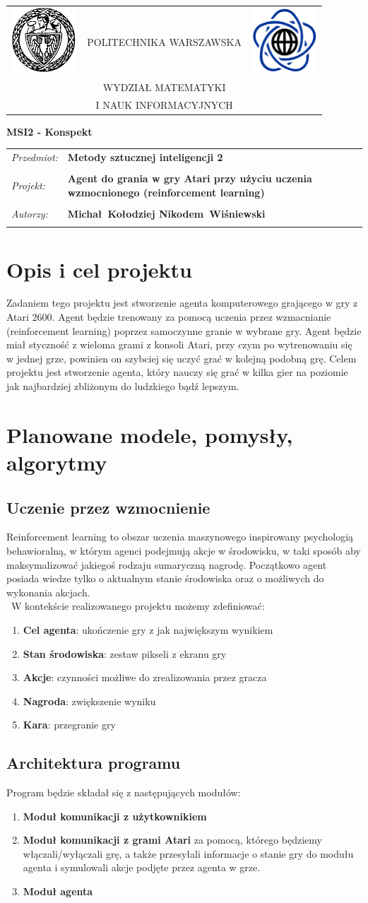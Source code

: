 \documentclass[12pt]{article}
\renewcommand{\maketitle}{
\begin{titlepage}
\begin{table}[t]
\centering
\begin{tabular}[t]{lcr}
 \includegraphics[width=70pt,height=70pt]{PW} & POLITECHNIKA WARSZAWSKA & \includegraphics[width=70pt,height=70pt]{MiNI}\\
& WYDZIAŁ MATEMATYKI & \\
& I NAUK INFORMACYJNYCH &
\end{tabular}
\end{table}
\vspace*{3cm}
  \begin{center}
    \LARGE
    \textbf {MSI2 - Konspekt}\\
   \vspace*{2 cm}
\begin{table}[!htp]
\begin{tabular}{p{4cm}p{9cm}}
\textit{Przedmiot:} &\textbf {Metody sztucznej inteligencji 2} \\
\\
\textit{Projekt:} &\textbf {Agent do grania w gry Atari przy użyciu uczenia wzmocnionego (reinforcement learning)} \\
\\
\textit{Autorzy:} &\textbf {Michał~Kołodziej \newline Nikodem~Wiśniewski} \\
\\
\end{tabular}
\end{table}

\vspace{5 cm}
  \center{\small Warszawa, dnia \today}
\end{center}
\end{titlepage}
}
\begin{document}
\maketitle


\section{Opis i cel projektu}
Zadaniem tego projektu jest stworzenie agenta komputerowego grającego w gry z Atari 2600. Agent będzie trenowany za pomocą uczenia przez wzmacnianie (reinforcement learning) poprzez samoczynne granie w wybrane gry. Agent będzie miał styczność z wieloma grami z konsoli Atari, przy czym po wytrenowaniu się w jednej grze, powinien on szybciej się uczyć grać w kolejną podobną grę. 
Celem projektu jest stworzenie agenta, który nauczy się grać w kilka gier na poziomie jak najbardziej zbliżonym do ludzkiego bądź lepszym.

\section{Planowane modele, pomysły, algorytmy}

\subsection{Uczenie przez wzmocnienie}
Reinforcement learning to obszar uczenia maszynowego inspirowany psychologią behawioralną, w którym agenci podejmują akcje w środowisku, w taki sposób aby maksymalizować jakiegoś rodzaju sumaryczną nagrodę. Początkowo agent posiada wiedze tylko o aktualnym stanie środowiska oraz o możliwych do wykonania akcjach.
\\\
W kontekście realizowanego projektu możemy zdefiniować:
\begin{enumerate}
\item \textbf{Cel agenta}: ukończenie gry z jak największym wynikiem
\item \textbf{Stan środowiska}: zestaw pikseli z ekranu gry
\item \textbf{Akcje}: czynności możliwe do zrealizowania przez gracza
\item \textbf{Nagroda}: zwiększenie wyniku
\item \textbf{Kara}: przegranie gry
\end{enumerate}

\subsection{Architektura programu}
Program będzie składał się z następujących modułów:
\begin{enumerate}
\item \textbf{Moduł komunikacji z użytkownikiem}
\item \textbf{Moduł komunikacji z grami Atari} za pomocą, którego będziemy włączali/wyłączali grę, a także przesyłali informacje o stanie gry do modułu agenta i symulowali akcje podjęte przez agenta w grze.
\item \textbf{Moduł agenta}
\end{enumerate}
\end{document}
